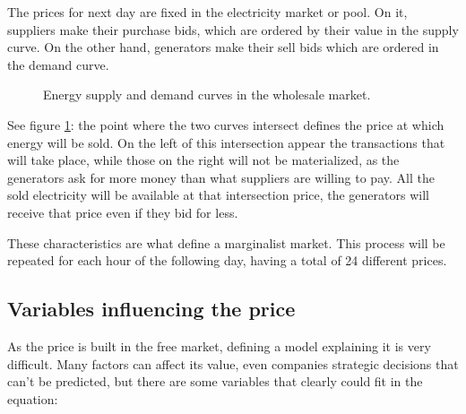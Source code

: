 The prices for next day are fixed in the electricity market or pool.
On it, suppliers make their purchase bids, which are ordered by their value in the supply curve.
On the other hand, generators make their sell bids which are ordered in the demand curve.

\begin{figure}[H]
\centering
    \caption{Energy supply and demand curves in the wholesale market. \cite{curva-oferta-demanda}}
    \label{fig:supply-demand-curves}
\end{figure}

See figure \ref{fig:supply-demand-curves}: the point where the two curves intersect defines the price at which energy will be sold. On the left of this intersection appear the transactions that will take place, while those on the right will not be materialized, as the generators ask for more money than what suppliers are willing to pay.
All the sold electricity will be available at that intersection price, the generators will receive that price even if they bid for less.

These characteristics are what define a marginalist market.
This process will be repeated for each hour of the following day, having a total of 24 different prices.

\subsection{Variables influencing the price}
As the price is built in the free market, defining a model explaining it is very difficult.
Many factors can affect its value, even companies strategic decisions that can't be predicted, but there are some variables that clearly could fit in the equation: \cite{mercado-electrico-periodico-energia, mercado-electrico-cambio-energetico}

